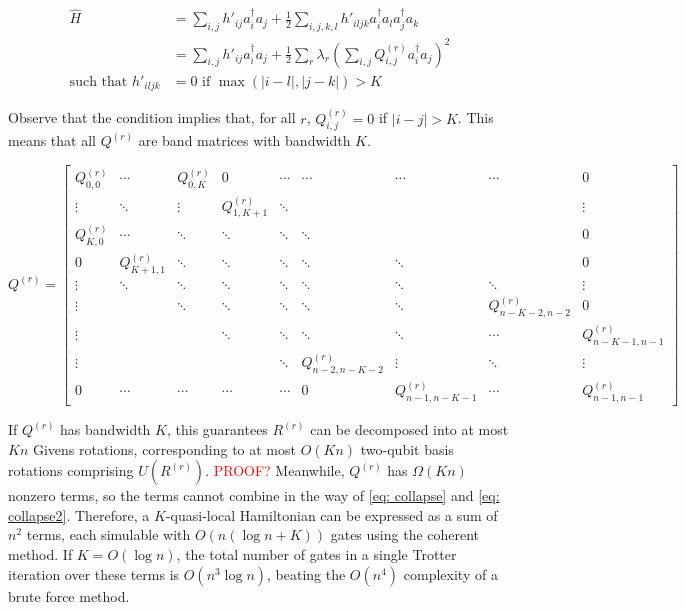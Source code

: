 \begin{equation}
    \begin{split}
        \hat{H} &= \sum_{i, j} h'_{ij}a^\dag_ia_j + \frac{1}{2}\sum_{i,j,k,l} h'_{iljk}a^\dag_ia_la^\dag_ja_k \\
        &= \sum_{i, j} h'_{ij}a^\dag_ia_j + \frac{1}{2}\sum_r\lambda_r\left(\sum_{i,j} Q^{(r)}_{i, j}a^\dag_ia_j\right)^2 \\
        \text{such that } h'_{iljk} &= 0 \text{ if } \max(|i - l|, |j - k|) > K
    \end{split}
\end{equation}

Observe that the condition implies that, for all $r$, $Q^{(r)}_{i, j} = 0$ if $|i - j| > K$. This means that all $Q^{(r)}$ are band matrices with bandwidth $K$.

\begin{equation}
    Q^{(r)} = \begin{bmatrix}
        Q^{(r)}_{0, 0} & \cdots & Q^{(r)}_{0, K} & 0 & \cdots & \cdots & \cdots & \cdots & 0 \\
        \vdots & \ddots & \vdots & Q^{(r)}_{1, K + 1} & \ddots & & & & \vdots \\
        Q^{(r)}_{K, 0} & \cdots & \ddots & \ddots & \ddots & \ddots & & & 0 \\
        0 & Q^{(r)}_{K + 1, 1} & \ddots & \ddots & \ddots & \ddots & \ddots & & 0 \\
        \vdots & \ddots & \ddots & \ddots & \ddots & \ddots & \ddots & \ddots & \vdots \\
        \vdots & & \ddots & \ddots & \ddots & \ddots & \ddots & Q^{(r)}_{n - K - 2, n - 2} & 0 \\
        \vdots & & & \ddots & \ddots & \ddots & \ddots & \cdots & Q^{(r)}_{n - K - 1, n - 1} \\
        \vdots & & & & \ddots & Q^{(r)}_{n - 2, n - K - 2} & \vdots & \ddots & \vdots \\
        0 & \cdots & \cdots & \cdots & \cdots & 0 & Q^{(r)}_{n - 1, n - K - 1} & \cdots & Q^{(r)}_{n - 1, n - 1}
    \end{bmatrix}
\end{equation}

If $Q^{(r)}$ has bandwidth $K$, this guarantees $R^{(r)}$ can be decomposed into at most $Kn$ Givens rotations, corresponding to at most $O(Kn)$ two-qubit basis rotations comprising $U(R^{(r)})$. \textcolor{red}{PROOF?} Meanwhile, $Q^{(r)}$ has $\Omega(Kn)$ nonzero terms, so the terms cannot combine in the way of \eqref{eq: collapse} and \eqref{eq: collapse2}. Therefore, a $K$-quasi-local Hamiltonian can be expressed as a sum of $n^2$ terms, each simulable with $O(n(\log{n} + K))$ gates using the coherent method. If $K = O(\log{n})$, the total number of gates in a single Trotter iteration over these terms is $O(n^3\log{n})$, beating the $O(n^4)$ complexity of a brute force method.


